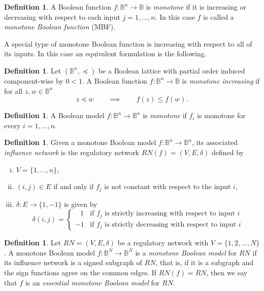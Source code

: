 \documentclass[12pt, notitlepage]{amsart}
\theoremstyle{definition}
\newtheorem{defn}[thm]{Definition}
\newcommand{\bbB}{\mathbb{B}}
\begin{document}
  \begin{defn}
    \label{defn:MBF}
    A Boolean function $f \colon \bbB^n \to \bbB$ is \emph{monotone} if it is increasing or decreasing with respect to each input $j = 1, \ldots, n$. In this case $f$ is called a \emph{monotone Boolean function} (MBF).
  \end{defn}

  A special type of monotone Boolean function is increasing with respect to all of its inputs. In this case an equivalent formulation is the following.

  \begin{defn}
    \label{defn:MBF_increasing}
    Let $(\bbB^n, \preceq)$ be a Boolean lattice with partial order induced component-wise by $0 < 1$. A Boolean function $f \colon \bbB^n \to \bbB$ is \emph{monotone increasing} if for all $z, w \in \bbB^n$
    \[
      z \preceq w \qquad \implies \qquad f(z) \leq f(w).
    \]
  \end{defn}

  \begin{defn}
    A Boolean model $f \colon \bbB^n \to \bbB^n$ is \emph{monotone} if $f_i$ is monotone for every $i = 1, \ldots, n$.
  \end{defn}

  \begin{defn}
    \label{def:regulatory_network}
    Given a monotone Boolean model $f \colon \bbB^n \to \bbB^n$, its associated \emph{influence network} is the regulatory network $RN(f) = (V, E, \delta)$ defined by
    \begin{enumerate}[(i)]
      \item $V = \{1, \ldots, n \}$,
      \item $(i, j) \in E$ if and only if $f_j$ is not constant with respect to the input $i$,
      \item $\delta \colon E \to \{1, -1\}$ is given by
        \[
          \delta(i, j) =
          \begin{cases}
            \;\;\, 1  & \text{if } f_j \text{ is strictly increasing with respect to input } i \\
            -1 & \text{if } f_j \text{ is strictly decreasing with respect to input } i
          \end{cases}
        \]
    \end{enumerate}
  \end{defn}

  \begin{defn}
    Let $RN = (V, E, \delta)$ be a regulatory network with $V = \{ 1, 2, \ldots, N \}$. A monotone Boolean model $f \colon \bbB^N \to \bbB^N$ is a \emph{monotone Boolean model} for $RN$ if its influence network is a signed subgraph of $RN$, that is, if it is a subgraph and the sign functions agree on the common edges. If $RN(f)=RN$, then we say that $f$ is an \emph{essential monotone Boolean model} for $RN$.
  \end{defn}
\end{document}
